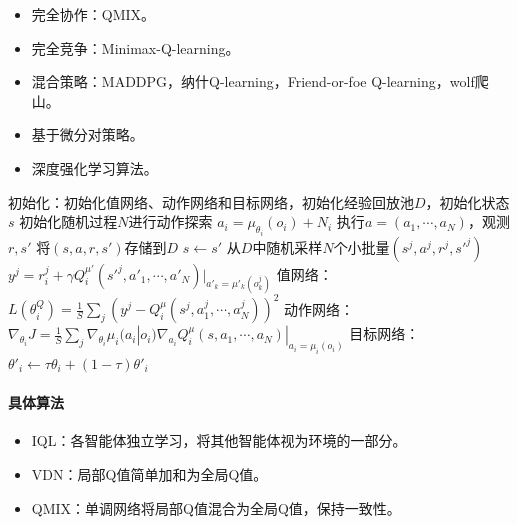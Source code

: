\documentclass[
12pt, %
a4paper, 
oneside, %
]{scrartcl}
\begin{document}
\begin{itemize}
\item 完全协作：QMIX。
\item 完全竞争：Minimax-Q-learning。
\item 混合策略：MADDPG，纳什Q-learning，Friend-or-foe Q-learning，wolf爬山。
\item 基于微分对策略。
\item 深度强化学习算法。
\end{itemize}
\begin{myalgorithm}[MADDPG]
\State 初始化：初始化值网络、动作网络和目标网络，初始化经验回放池$ D $，初始化状态$ s $
\State 初始化随机过程$ N $进行动作探索
\State $ a_i = \mu_{\theta_i}(o_i) + N_i $ 
\State 执行$ a = (a_1, \cdots, a_N) $，观测$ r, s' $
\State 将$ (s, a, r, s')$存储到$ D $
\State $ s \leftarrow s'$
\State 从$ D $中随机采样$ N $个小批量$ (s^j, a^j, r^j, s'^j) $
\State $ y^j = r_i^j + \gamma Q_i^{\mu'}(s'^j, a'_1, \cdots, a'_N)|_{a'_k = \mu'_k(o_k^j)} $ 
\State 值网络：$ L(\theta_i^Q) = \frac{1}{S}\sum_j(y^j - Q_i^{\mu}(s^j, a_1^j, \cdots, a_N^j))^2 $ 
\State 动作网络：$ \nabla_{\theta_i}J = \frac{1}{S}\sum_j \nabla_{\theta_i}\mu_i(a_i|o_i)\nabla_{a_i}Q_i^{\mu}(s, a_1, \cdots, a_N)|_{a_i = \mu_i(o_i)}$ 
\State 目标网络：$ \theta'_i \leftarrow \tau \theta_i + (1 - \tau)\theta'_i $
\EndFor
\EndFor
\EndFor
\end{myalgorithm}
\paragraph{具体算法}
\begin{itemize}
\item IQL：各智能体独立学习，将其他智能体视为环境的一部分。
\item VDN：局部Q值简单加和为全局Q值。
\item QMIX：单调网络将局部Q值混合为全局Q值，保持一致性。
\end{itemize}
\end{document}
